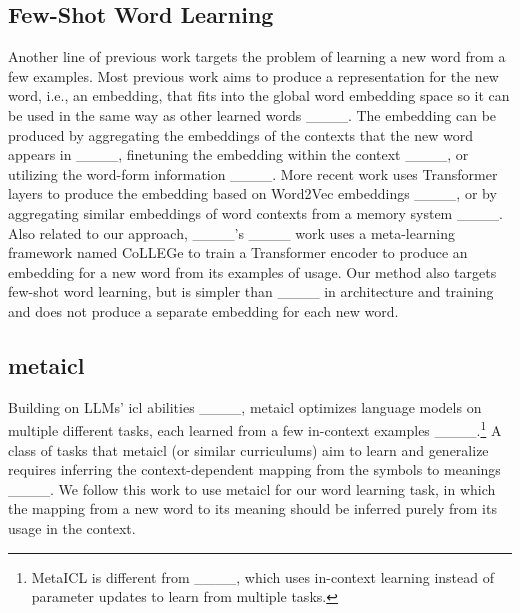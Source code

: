 \subsection{Few-Shot Word Learning}
\label{sec:related-work-few-shot-word-learning}
Another line of previous work targets the problem of learning a new word from a few examples.
Most previous work aims to produce a representation for the new word, i.e., an embedding, that fits into the global word embedding space so it can be used in the same way as other learned words ____. The embedding can be produced by aggregating the embeddings of the contexts that the new word appears in ____, finetuning the embedding within the context ____, or utilizing the word-form information ____. %
More recent work uses Transformer layers to produce the embedding based on Word2Vec embeddings ____, or by aggregating similar embeddings of word contexts from a memory system ____.
Also related to our approach, ____'s ____ work uses a meta-learning framework named CoLLEGe to train a Transformer encoder to produce an embedding for a new word from its examples of usage.
Our method also targets few-shot word learning, but is simpler than ____ in architecture and training and does not produce a separate embedding for each new word.

\subsection{\acl{metaicl}}
Building on LLMs' \acl{icl} abilities ____, \acf{metaicl} optimizes language models on multiple different tasks, each learned from a few in-context examples ____.\footnote{MetaICL is different from ____, which uses in-context learning instead of parameter updates to learn from multiple tasks.}
A class of tasks that \ac{metaicl} (or similar curriculums) aim to learn and generalize requires inferring the context-dependent mapping from the symbols to meanings ____.
We follow this work to use \ac{metaicl} for our word learning task, in which the mapping from a new word to its meaning should be inferred purely from its usage in the context.


